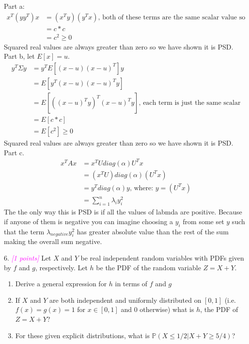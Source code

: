\documentclass{article}
\newcommand{\1}{\mathbf{1}}
\renewcommand{\P}{\mathbb{P}}
\newcommand{\grade}[1]{\small\textcolor{magenta}{\emph{[#1 points]}} \normalsize}
\begin{document}
Part a:
\begin{align}
    x^T(yy^T)x & = (x^Ty) (y^Tx) \text{, both of these terms are the same scalar value so}\\
    & = c*c \\
    & = c^2 \ge 0 
\end{align}
Squared real values are always greater than zero so we have shown it is PSD.\\

Part b, let $E[x] =u $.
\begin{align}
    y^T\Sigma y & = y^T E[(x-u)(x-u)^T] y \\
    & =  E[y^T(x-u)(x-u)^T y]  \\
    & =  E[ ((x-u)^Ty)^T(x-u)^T y] \text{, each term is just the same scalar} \\
    & =  E[ c*c ] \\
    & = E[c^2] \ge 0 
\end{align}
Squared real values are always greater than zero so we have shown it is PSD.\\

Part c. 
\begin{align}
    x^TAx & = x^TU diag(\alpha)U^Tx \\ 
    & = (x^TU) diag(\alpha) (U^Tx) \\
    & = y^T diag(\alpha) y \text{, where: } y=(U^Tx)  \\
    & = \sum_{i=1}^n \lambda_i y_i^2
\end{align}
The the only way this is PSD is if all the values of labmda are positive. Because if anyone of them is negative you can imagine choosing a $y_i$ from some set $y$ such that the term $\lambda_{negative} y_i^2$ has greater absolute value than the rest of the sum making the overall sum negative. \\



\newpage





{\color{blue}

6. \grade{1} Let $X$ and $Y$ be real independent random variables with PDFs given by $f$ and $g$, respectively. Let $h$ be the PDF of the random variable $Z = X+Y$.
\begin{enumerate}
	\item Derive a general expression for $h$ in terms of $f$ and $g$
	\item If $X$ and $Y$ are both independent and uniformly distributed on $[0,1]$ (i.e. $f(x)=g(x)=1$ for $x \in [0,1]$ and $0$ otherwise) what is $h$, the PDF of $Z=X+Y$?
	\item For these given explicit distributions, what is $\P(X \leq 1/2 | X+Y\geq 5/4)$?
\end{enumerate}
}
\end{document}
